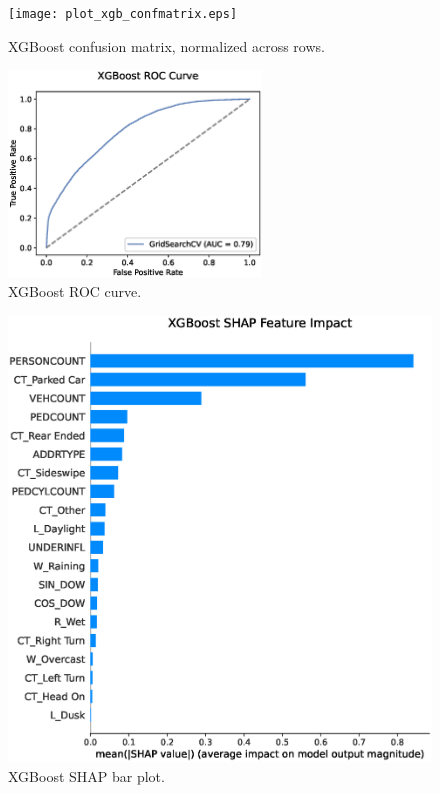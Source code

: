 \documentclass[12pt]{article}
\begin{document}
\begin{figure}
        \centering
        \texttt{[image: plot\_xgb\_confmatrix.eps]}
        \caption{XGBoost confusion matrix, normalized across rows.\label{fig:xgbmatrix}}
\end{figure}

\begin{figure}
        \centering
        \includegraphics[width=0.6\textwidth]{plot_xgb_roc.eps}
        \caption{XGBoost ROC curve.\label{fig:xgbroc}}
\end{figure}

\begin{figure}
        \centering
        \includegraphics[width=\textwidth]{plot_shap_bar.eps}
        \caption{XGBoost SHAP bar plot.\label{fig:xgbshapbar}}
\end{figure}
\end{document}
